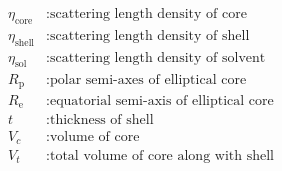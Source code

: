 \begin{align}
\eta_\text{core} &: \text{scattering length density of core} \nonumber \\
\eta_\text{shell} &: \text{scattering length density of shell} \nonumber \\
\eta_\text{sol} &: \text{scattering length density of solvent} \nonumber \\
R_\mathrm{p} &: \text{polar semi-axes of elliptical core} \nonumber \\
R_\mathrm{e} &: \text{equatorial semi-axis of elliptical core} \nonumber \\
t &: \text{thickness of shell} \nonumber \\
V_c &: \text{volume of core} \nonumber \\
V_t &: \text{total volume of core along with shell} \nonumber
\end{align}

